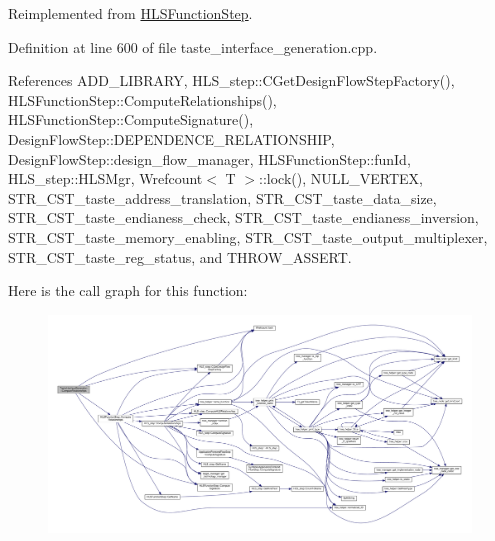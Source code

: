Reimplemented from \hyperlink{classHLSFunctionStep_ab3864e8dbd73b0eabc25f386a0cece54}{H\+L\+S\+Function\+Step}.



Definition at line 600 of file taste\+\_\+interface\+\_\+generation.\+cpp.



References A\+D\+D\+\_\+\+L\+I\+B\+R\+A\+RY, H\+L\+S\+\_\+step\+::\+C\+Get\+Design\+Flow\+Step\+Factory(), H\+L\+S\+Function\+Step\+::\+Compute\+Relationships(), H\+L\+S\+Function\+Step\+::\+Compute\+Signature(), Design\+Flow\+Step\+::\+D\+E\+P\+E\+N\+D\+E\+N\+C\+E\+\_\+\+R\+E\+L\+A\+T\+I\+O\+N\+S\+H\+IP, Design\+Flow\+Step\+::design\+\_\+flow\+\_\+manager, H\+L\+S\+Function\+Step\+::fun\+Id, H\+L\+S\+\_\+step\+::\+H\+L\+S\+Mgr, Wrefcount$<$ T $>$\+::lock(), N\+U\+L\+L\+\_\+\+V\+E\+R\+T\+EX, S\+T\+R\+\_\+\+C\+S\+T\+\_\+taste\+\_\+address\+\_\+translation, S\+T\+R\+\_\+\+C\+S\+T\+\_\+taste\+\_\+data\+\_\+size, S\+T\+R\+\_\+\+C\+S\+T\+\_\+taste\+\_\+endianess\+\_\+check, S\+T\+R\+\_\+\+C\+S\+T\+\_\+taste\+\_\+endianess\+\_\+inversion, S\+T\+R\+\_\+\+C\+S\+T\+\_\+taste\+\_\+memory\+\_\+enabling, S\+T\+R\+\_\+\+C\+S\+T\+\_\+taste\+\_\+output\+\_\+multiplexer, S\+T\+R\+\_\+\+C\+S\+T\+\_\+taste\+\_\+reg\+\_\+status, and T\+H\+R\+O\+W\+\_\+\+A\+S\+S\+E\+RT.

Here is the call graph for this function\+:
\nopagebreak
\begin{figure}[H]
\begin{center}
\leavevmode
\includegraphics[width=350pt]{dc/d30/classTasteInterfaceGeneration_aef8be37534a1f17bdfdb6c26ff565fac_cgraph}
\end{center}
\end{figure}
\mbox{\label{classTasteInterfaceGeneration_a3cfa566432fc5a45a50ef491a4ba83f6}} 
